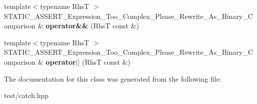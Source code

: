 \begin{DoxyCompactItemize}
\item 
{\footnotesize template$<$typename RhsT $>$ }\\S\+T\+A\+T\+I\+C\+\_\+\+A\+S\+S\+E\+R\+T\+\_\+\+Expression\+\_\+\+Too\+\_\+\+Complex\+\_\+\+Please\+\_\+\+Rewrite\+\_\+\+As\+\_\+\+Binary\+\_\+\+Comparison \& {\bfseries operator\&\&} (RhsT const \&)\hypertarget{classCatch_1_1ExpressionResultBuilder_a23c8da24256b37ac32fad19d3acee5c4}{}\label{classCatch_1_1ExpressionResultBuilder_a23c8da24256b37ac32fad19d3acee5c4}

\item 
{\footnotesize template$<$typename RhsT $>$ }\\S\+T\+A\+T\+I\+C\+\_\+\+A\+S\+S\+E\+R\+T\+\_\+\+Expression\+\_\+\+Too\+\_\+\+Complex\+\_\+\+Please\+\_\+\+Rewrite\+\_\+\+As\+\_\+\+Binary\+\_\+\+Comparison \& {\bfseries operator$\vert$$\vert$} (RhsT const \&)\hypertarget{classCatch_1_1ExpressionResultBuilder_a72bf498d09ede40cd0bd74633f9623b7}{}\label{classCatch_1_1ExpressionResultBuilder_a72bf498d09ede40cd0bd74633f9623b7}

\end{DoxyCompactItemize}


The documentation for this class was generated from the following file\+:\begin{DoxyCompactItemize}
\item 
test/catch.\+hpp\end{DoxyCompactItemize}
